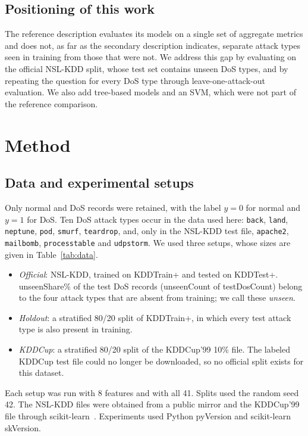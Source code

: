 \documentclass[conference]{IEEEtran}
\newcommand{\nm}[1]{\csname #1\endcsname}
\newcommand{\pc}[1]{\csname #1\endcsname\%}
\begin{document}
\subsection{Positioning of this work}
The reference description evaluates its models on a single set of aggregate metrics and does not, as far as the secondary description indicates, separate attack types seen in training from those that were not. We address this gap by evaluating on the official NSL-KDD split, whose test set contains unseen DoS types, and by repeating the question for every DoS type through leave-one-attack-out evaluation. We also add tree-based models and an SVM, which were not part of the reference comparison.

\section{Method}\label{sec:method}
\subsection{Data and experimental setups}
Only normal and DoS records were retained, with the label $y=0$ for normal and $y=1$ for DoS. Ten DoS attack types occur in the data used here: \texttt{back}, \texttt{land}, \texttt{neptune}, \texttt{pod}, \texttt{smurf}, \texttt{teardrop}, and, only in the NSL-KDD test file, \texttt{apache2}, \texttt{mailbomb}, \texttt{processtable} and \texttt{udpstorm}. We used three setups, whose sizes are given in Table~\ref{tab:data}.

\begin{itemize}
  \item \emph{Official}: NSL-KDD, trained on KDDTrain+ and tested on KDDTest+. \pc{unseenShare} of the test DoS records (\nm{unseenCount} of \nm{testDosCount}) belong to the four attack types that are absent from training; we call these \emph{unseen}.
  \item \emph{Holdout}: a stratified 80/20 split of KDDTrain+, in which every test attack type is also present in training.
  \item \emph{KDDCup}: a stratified 80/20 split of the KDDCup'99 10\% file. The labeled KDDCup test file could no longer be downloaded, so no official split exists for this dataset.
\end{itemize}
Each setup was run with 8 features and with all 41. Splits used the random seed 42. The NSL-KDD files were obtained from a public mirror and the KDDCup'99 file through scikit-learn~\cite{pedregosa2011}. Experiments used Python \nm{pyVersion} and scikit-learn \nm{skVersion}.
\end{document}
